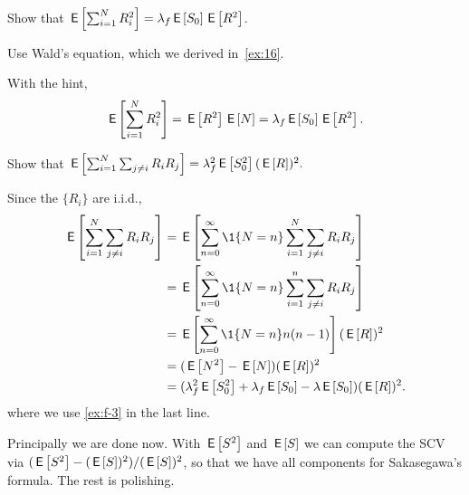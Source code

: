 \begin{extra}
 Show that $\,\mathsf{E}\left[\sum_{i=1}^N R_i^2\right] = \lambda_f \,\mathsf{E}\left[S_0 \right]\,\mathsf{E}\left[R^2\right]$.
\begin{hint}
 Use Wald's equation, which we derived in~\cref{ex:16}.
\end{hint}
\begin{solution}
  With the hint,
 \begin{align*}
 \,\mathsf{E}\left[\sum_{i=1}^N R_i^2\right] = \,\mathsf{E}\left[R^2\right]\,\mathsf{E}\left[N\right] = \lambda_f \,\mathsf{E}\left[S_0\right] \,\mathsf{E}\left[R^2\right].
 \end{align*}
\end{solution}
\end{extra}

\begin{extra}
Show that 
$\,\mathsf{E}\left[\sum_{i=1}^N \sum_{j\neq i} R_i R_j\right] = \lambda_f^2 \,\mathsf{E}\left[S_0^2\right] (\,\mathsf{E}\left[R\right])^2.$
\begin{solution}
Since the $\{R_i\}$ are i.i.d., 
 \begin{align*}
\E{\sum_{i=1}^N \sum_{j\neq i} R_i R_j}
&=\E{\sum_{n=0}^\infty \1{N=n} \sum_{i=1}^N \sum_{j\neq i} R_i R_j} \\
&=\E{\sum_{n=0}^\infty \1{N=n} \sum_{i=1}^n \sum_{j\neq i} R_i R_j} \\
&=\E{\sum_{n=0}^\infty \1{N=n} n(n-1)} (\E{R})^2\\ 
&=(\E{N^2} - \E{N}) (\E{R})^2\\ 
&=(\lambda_f^2 \E{S_0^2} + \lambda_f \E{S_0} - \lambda \E{S_0} ) (\E{R})^2.
 \end{align*}
where we use \cref{ex:f-3} in the last line. 
\end{solution}
\end{extra}

Principally we are done now. With  $\,\mathsf{E}\left[S^2\right]$ and $\,\mathsf{E}\left[S\right]$ we can compute the SCV via $(\,\mathsf{E}\left[S^2\right]-(\,\mathsf{E}\left[S\right])^2)/(\,\mathsf{E}\left[S\right])^2$, so that we have all components for Sakasegawa's formula.  The rest is polishing. 

